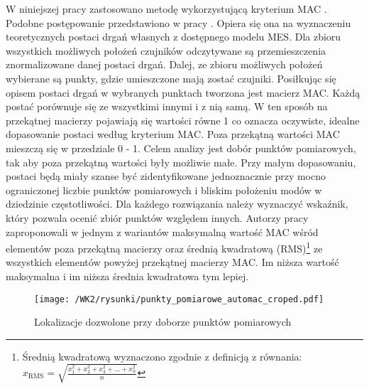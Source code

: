 W niniejszej pracy zastosowano metodę wykorzystującą kryterium MAC \parencite{Penny1994}. Podobne postępowanie przedstawiono w pracy \cite{Poprawa2018}. Opiera się ona na wyznaczeniu teoretycznych postaci drgań własnych z dostępnego modelu MES. Dla zbioru wszystkich możliwych położeń czujników odczytywane są przemieszczenia znormalizowane danej postaci drgań. Dalej, ze zbioru możliwych położeń wybierane są punkty, gdzie umieszczone mają zostać czujniki. Posiłkując się opisem postaci drgań w wybranych punktach tworzona jest macierz MAC. Każdą postać porównuje się ze wszystkimi innymi i z nią samą. W ten sposób na przekątnej macierzy pojawiają się wartości równe 1 co oznacza oczywiste, idealne dopasowanie postaci według kryterium MAC. Poza przekątną wartości MAC mieszczą się w przedziale 0 - 1. Celem analizy jest dobór punktów pomiarowych, tak aby poza przekątną wartości były możliwie małe. Przy małym dopasowaniu, postaci będą miały szanse być zidentyfikowane jednoznacznie przy mocno ograniczonej liczbie punktów pomiarowych i bliskim położeniu modów w dziedzinie częstotliwości. Dla każdego rozwiązania należy wyznaczyć wskaźnik, który pozwala ocenić zbiór punktów względem innych. Autorzy pracy \cite{Penny1994} zaproponowali w jednym z wariantów maksymalną wartość MAC wśród elementów poza przekątną macierzy oraz średnią kwadratową (RMS)\footnote{
	Średnią kwadratową wyznaczono zgodnie z definicją z równania: $x_{\text{RMS}}=\sqrt{\frac{x_1^2+x_2^2+x_3^2+\dots+x_n^2}{n}}$} 
ze wszystkich elementów powyżej przekątnej macierzy MAC. Im niższa wartość maksymalna i im niższa średnia kwadratowa tym lepiej.
\begin{figure}[hbt!]
	\centering
	\texttt{[image: /WK2/rysunki/punkty\_pomiarowe\_automac\_croped.pdf]}
	\captionsetup{justification=centering}
	\caption{Lokalizacje dozwolone przy doborze punktów pomiarowych}
	\label{fig: wk2_automac_points_all}
\end{figure}

